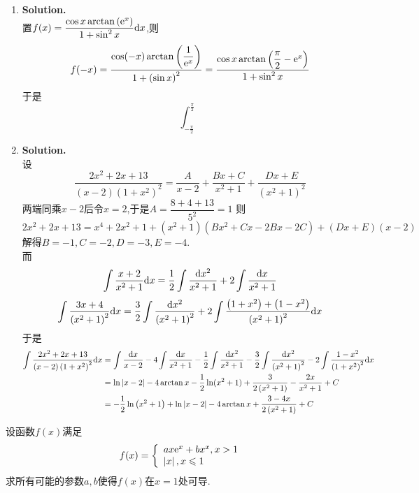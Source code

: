 \documentclass{ctexart}
\begin{document}
\begin{solution}
    \begin{enumerate}[label=\textbf{(\arabic*)}]
        \item \textbf{Solution.}\\
            置$f(x)=\dfrac{\cos x\arctan\left(\mathrm{e}^x\right)}{1+\sin^2x}\mathrm{d} x$,则
            $$f(-x)=\dfrac{\cos(-x)\arctan\left(\dfrac{1}{\mathrm{e}^x}\right)}{1+\left(\sin x\right)^2}=\dfrac{\cos x\arctan\left(\dfrac{\pi}{2}-\mathrm{e}^x\right)}{1+\sin^2x}$$
            于是$$\int_{-\frac{\pi}{2}}^{\frac{\pi}{2}}$$
        \item \textbf{Solution.}\\
            设$$\dfrac{2x^2+2x+13}{(x-2)\left(1+x^2\right)^2}=\dfrac{A}{x-2}+\dfrac{Bx+C}{x^2+1}+\dfrac{Dx+E}{\left(x^2+1\right)^2}$$
            两端同乘$x-2$后令$x=2$,于是$A=\dfrac{8+4+13}{5^2}=1$
            则$$2x^2+2x+13=x^4+2x^2+1+\left(x^2+1\right)\left(Bx^2+Cx-2Bx-2C\right)+(Dx+E)(x-2)$$
            解得$B=-1,C=-2,D=-3,E=-4$.\\
            而$$\int\dfrac{x+2}{x^2+1}\mathrm{d} x=\dfrac{1}{2}\int\dfrac{\mathrm{d} x^2}{x^2+1}+2\int\dfrac{\mathrm{d} x}{x^2+1}$$
            $$\int\dfrac{3x+4}{\left(x^2+1\right)^2}\mathrm{d} x=\dfrac{3}{2}\int\dfrac{\mathrm{d} x^2}{\left(x^2+1\right)^2}+2\int\dfrac{\left(1+x^2\right)+\left(1-x^2\right)}{\left(x^2+1\right)^2}\mathrm{d} x$$
            于是$$\begin{aligned}
                \int\dfrac{2x^2+2x+13}{(x-2)\left(1+x^2\right)^2}\mathrm{d} x
                &= \int\dfrac{\mathrm{d} x}{x-2}-4\int\dfrac{\mathrm{d} x}{x^2+1}-\dfrac{1}{2}\int\dfrac{\mathrm{d} x^2}{x^2+1}-\dfrac{3}{2}\int\dfrac{\mathrm{d} x^2}{\left(x^2+1\right)^2}-2\int\dfrac{1-x^2}{\left(1+x^2\right)^2}\mathrm{d} x \\
                &= \ln\left|x-2\right|-4\arctan x-\dfrac{1}{2}\ln(x^2+1)+\dfrac{3}{2\left(x^2+1\right)}-\dfrac{2x}{x^2+1}+C\\
                &= -\dfrac{1}{2}\ln\left(x^2+1\right)+\ln\left|x-2\right|-4\arctan x+\dfrac{3-4x}{2\left(x^2+1\right)}+C
            \end{aligned}$$
    \end{enumerate}
\end{solution}
\begin{problem}[4.(8\songti{分})]
    设函数$f(x)$满足$$f(x)=\left\{\begin{array}{l}ax\mathrm{e}^x+bx^x,x>1\\\left|x\right|,x\leqslant1\end{array}\right.$$
    求所有可能的参数$a,b$使得$f(x)$在$x=1$处可导.
\end{problem}
\end{document}

